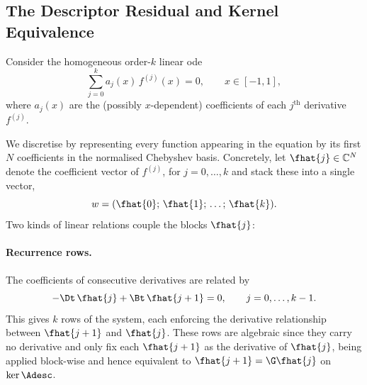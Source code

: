 \subsection{The Descriptor Residual and Kernel Equivalence}
\label{sec:descriptor-residual}

Consider the homogeneous order-$k$ linear \gls{ode}
\begin{equation}
  \sum_{j=0}^{k} a_j(x)\, f^{(j)}(x) = 0, \qquad x \in [-1,1],
\end{equation}
where $a_j(x)$ are the (possibly $x$-dependent) coefficients of each $j^\text{th}$ derivative $f^{(j)}$.

We discretise by representing every function appearing in the equation
by its first $N$ coefficients in the normalised Chebyshev basis. Concretely,
let $\fhat{j} \in \mathbb{C}^N$ denote the coefficient vector of $f^{(j)}$, for $j = 0, \dots, k$ and stack these into a single vector,
\begin{equation}
  w = (\fhat{0};\, \fhat{1};\, \dots;\, \fhat{k}).
\end{equation}
Two kinds of linear relations couple the blocks $\fhat{j}$:

\paragraph{Recurrence rows.} The coefficients of consecutive derivatives are related by
\begin{equation}
  -\Dt\, \fhat{j} + \Bt\, \fhat{j+1} = 0, \qquad j = 0, \dots, k-1.
  \label{eq:descriptor-recurrence-rows}
\end{equation}
This gives $k$ rows of the system, each enforcing the derivative relationship between $\fhat{j+1}$ and $\fhat{j}$. These rows are algebraic since they carry no derivative and only fix each $\fhat{j+1}$ as the derivative of $\fhat{j}$, being  applied block-wise and hence equivalent to $\fhat{j+1} = \G \fhat{j}$ on $\ker \Adesc$.

